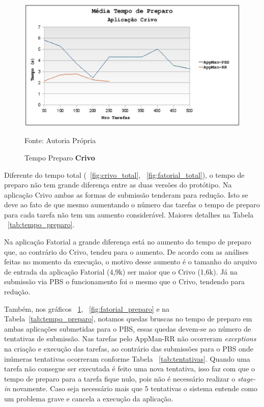 \begin{figure}[hbtp]
\begin{center}
\includegraphics[scale=0.77]{./img/PreparoCrivo.ps}
\caption{Tempo Preparo \textbf{Crivo}}
\label{fig:crivo_preparo}
Fonte: Autoria Própria
\end{center}
\end{figure}


Diferente do tempo total (~\ref{fig:crivo_total}, ~\ref{fig:fatorial_total}), o tempo de preparo não tem grande diferença entre as duas versões do protótipo. Na aplicação Crivo ambas as formas de submissão tenderam para redução. Isto se deve ao fato de que mesmo aumentando o número das tarefas o tempo de preparo para cada tarefa não tem um aumento considerável. Maiores detalhes na Tabela ~\ref{tab:tempo_preparo}. 

Na aplicação Fatorial a grande diferença está no aumento do tempo de preparo que, ao contrário do Crivo, tendeu para o aumento. De acordo com as análises feitas no momento da execução, o motivo desse aumento é o tamanho do arquivo de entrada da aplicação Fatorial (4,9k) ser maior que o Crivo (1,6k). Já na submissão via PBS o funcionamento foi o mesmo que o Crivo, tendendo para redução. 

Também, nos gráficos ~\ref{fig:crivo_preparo}, ~\ref{fig:fatorial_preparo} e na Tabela~\ref{tab:tempo_preparo}, notamos quedas bruscas no tempo de preparo em ambas aplicações submetidas para o PBS, essas quedas devem-se ao número de tentativas de submissão. Nas tarefas pelo AppMan-RR não ocorreram \emph{exceptions} na criação e execução das tarefas, ao contrário das submissões para o PBS onde inúmeras tentativas ocorreram conforme Tabela ~\ref{tab:tentativas}. Quando uma tarefa não consegue ser executada é feito uma nova tentativa, isso faz com que o tempo de preparo para a tarefa fique nulo, pois não é necessário realizar o \emph{stage-in} novamente. Caso seja necessário mais que 5 tentativas o sistema entende como um problema grave e cancela a execução da aplicação.

